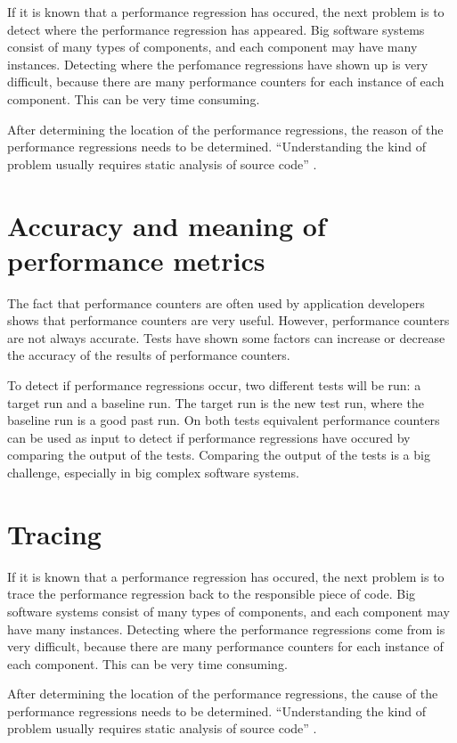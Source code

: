 If it is known that a performance regression has occured, the next problem is to detect where the performance regression has appeared. Big software systems consist of many types of components, and each component may have many instances. Detecting where the perfomance regressions have shown up is very difficult, because there are many performance counters for each instance of each component. This can be very time consuming.

After determining the location of the performance regressions, the reason of the performance regressions needs to be determined. ``Understanding the kind of problem usually requires static analysis of source code'' \cite{nguyen2012using}.

\section{Accuracy and meaning of performance metrics}
The fact that performance counters are often used by application developers shows that performance counters are very useful. However, performance counters are not always accurate. Tests have shown some factors can increase or decrease the accuracy of the results of performance counters. \cite{AccuracyPerformanceCounter}

To detect if performance regressions occur, two different tests will be run: a target run and a baseline run. The target run is the new test run, where the baseline run is a good past run. On both tests equivalent performance counters can be used as input to detect if performance regressions have occured by comparing the output of the tests. Comparing the output of the tests is a big challenge, especially in big complex software systems.

\section{Tracing}
If it is known that a performance regression has occured, the next problem is to trace the performance regression back to the responsible piece of code. Big software systems consist of many types of components, and each component may have many instances. Detecting where the performance regressions come from is very difficult, because there are many performance counters for each instance of each component. This can be very time consuming.

After determining the location of the performance regressions, the cause of the performance regressions needs to be determined. ``Understanding the kind of problem usually requires static analysis of source code'' \cite{nguyen2012using}.

